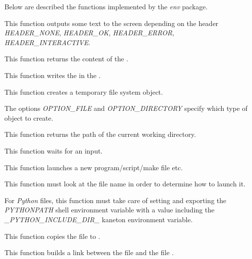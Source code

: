 Below are described the functions implemented by the \textit{env} package.

         {
	   This function outputs some text to the screen depending on the
	   header \textit{HEADER\_NONE}, \textit{HEADER\_OK},
	   \textit{HEADER\_ERROR}, \textit{HEADER\_INTERACTIVE}.
	 }

         {
	   This function returns the content of the .
	 }

         {
	   This function writes the  in the .
	 }

         {
	   This function creates a temporary file system object.

	   \-

	   The options \textit{OPTION\_FILE} and \textit{OPTION\_DIRECTORY}
	   specify which type of object to create.
	 }

         {
	   This function returns the path of the current working directory.
	 }

         {
	   This function waits for an input.
	 }

         {
	   This function launches a new program/script/make file etc.

	   \-

	   This function must look at the file name in order to determine
	   how to launch it.

	   \-

	   For \textit{Python} files, this function must take care of
	   setting and exporting the \textit{PYTHONPATH} shell environment
	   variable with a value including the
	   \textit{\_PYTHON\_INCLUDE\_DIR\_} kaneton environment variable.
	 }

         {
	   This function copies the file  to
	   .
	 }

         {
	   This function builds a link between the file 
	   and the file .
	 }

